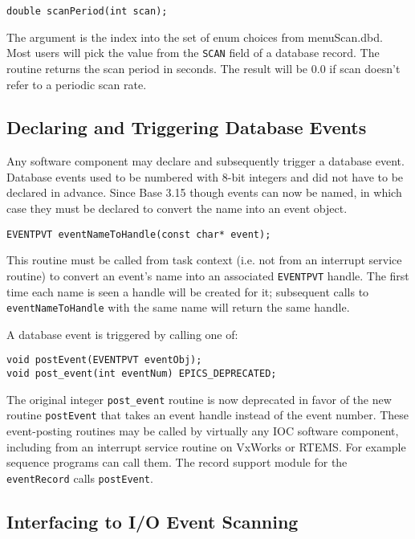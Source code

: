 \begin{verbatim}
double scanPeriod(int scan);
\end{verbatim}

The argument is the index into the set of enum choices from menuScan.dbd.
Most users will pick the value from the \verb|SCAN| field of a database record.
The routine returns the scan period in seconds.
The result will be 0.0 if scan doesn't refer to a periodic scan rate.

\subsection{Declaring and Triggering Database Events}

Any software component may declare and subsequently trigger a database event.
Database events used to be numbered with 8-bit integers and did not have to be declared in advance.
Since Base 3.15 though events can now be named, in which case they must be declared to convert the name into an event object.

\begin{verbatim}
EVENTPVT eventNameToHandle(const char* event);
\end{verbatim}

This routine must be called from task context (i.e. not from an interrupt service routine) to convert an event's name into an associated \verb|EVENTPVT| handle.
The first time each name is seen a handle will be created for it; subsequent calls to \verb|eventNameToHandle| with the same name will return the same handle.

A database event is triggered by calling one of:

\begin{verbatim}
void postEvent(EVENTPVT eventObj);
void post_event(int eventNum) EPICS_DEPRECATED;
\end{verbatim}

The original integer \verb|post_event| routine is now deprecated in favor of the new routine \verb|postEvent| that takes an event handle instead of the event number.
These event-posting routines may be called by virtually any IOC software component, including from an interrupt service routine on VxWorks or RTEMS.
For example sequence programs can call them.
The record support module for the \verb|eventRecord| calls \verb|postEvent|.

\subsection{Interfacing to I/O Event Scanning}

